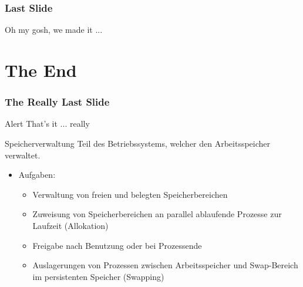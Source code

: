 \documentclass[
  en, %
  inputenc=utf8,
]{tuhhslides}
\begin{document}
\begin{frame}
  \frametitle{Last Slide}

  \alert<2->{Oh my gosh, we made it ...}

\end{frame}
  

\section{The End}
\label{sec:end}

\begin{frame}
  \frametitle{The Really Last Slide}
  \begin{alertblock}{Alert}
    That's it ... really
  \end{alertblock}
\end{frame}

\begin{frame}
\begin{tuhhdefinitionbox}{Speicherverwaltung}
Teil des Betriebssystems, welcher den Arbeitsspeicher verwaltet.
\end{tuhhdefinitionbox}
\begin{itemize}
        \item Aufgaben:
        \begin{itemize}
                \item Verwaltung von freien und belegten Speicherbereichen
                \item Zuweisung von Speicherbereichen an parallel ablaufende Prozesse zur Laufzeit (Allokation)
                \item Freigabe nach Benutzung oder bei Prozessende
                \item Auslagerungen von Prozessen zwischen Arbeitsspeicher und Swap-Bereich im persistenten Speicher (Swapping)
        \end{itemize}
\end{itemize}
\end{frame}
\end{document}
